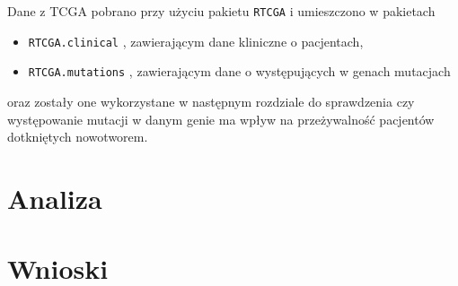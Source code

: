 Dane z TCGA pobrano przy użyciu pakietu \texttt{RTCGA} \cite{kosa1} i umieszczono w pakietach
\begin{itemize}
\item \texttt{RTCGA.clinical} \cite{kosa2}, zawierającym dane kliniczne o pacjentach,
\item \texttt{RTCGA.mutations} \cite{kosa3}, zawierającym dane o występujących w genach mutacjach
\end{itemize} 
oraz zostały one wykorzystane w następnym rozdziale do sprawdzenia czy występowanie mutacji w danym genie ma wpływ na przeżywalność pacjentów dotkniętych nowotworem.



\section{Analiza}\label{chap:analiza}
\section{Wnioski}\label{chap:wnioski}